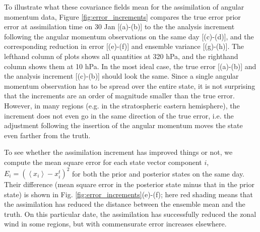 To illustrate what these covariance fields mean for the assimilation of angular momentum data, 
Figure \ref{fig:error_increments} compares the true error prior error at assimilation time on 30 Jan [(a)-(b)] to the the analysis increment following the angular momentum observations on the same day [(c)-(d)], and the corresponding reduction in error [(e)-(f)] and ensemble variance [(g)-(h)].
The lefthand column of plots shows all quantities at 320 hPa, and the righthand column shows them at 10 hPa. 
In the most ideal case, the true error [(a)-(b)] and the analysis increment [(c)-(b)] should look the same. 
Since a single angular momentum observation has to be spread over the entire state,
it is not surprising that the increments are an order of magnitude smaller than the true error. 
However, in many regions (e.g. in the stratospheric eastern hemisphere), the increment does not even go in the same direction of the true error, i.e. the adjustment following the insertion of the angular momentum moves the state even farther from the truth. 

To see whether the assimilation increment has improved things or not, we compute the mean square error for each state vector component $i$, 
$E_i = \left(\left< x_i \right>-x_{i}^{t}\right)^2$ for both the prior and posterior states on the same day.
Their difference (mean square error in the posterior state minus that in the prior state) is shown in Fig. \ref{fig:error_increments}(e)-(f);  
here red shading means that the assimilation has reduced the distance between the ensemble mean and the truth.  
On this particular date, the assimilation has successfully reduced the zonal wind in some regions, but with commensurate error increases elsewhere.

